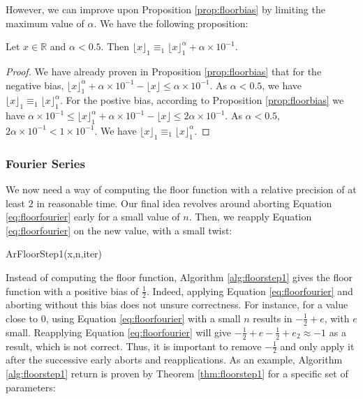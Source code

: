 \documentclass[runningheads]{llncs}
\begin{document}
However, we can improve upon Proposition \ref{prop:floorbias} by limiting the maximum value of $\alpha$. We have the following proposition:\begin{proposition}\label{prop:floorbiasopt}
  Let $x\in\mathbb{R}$ and $\alpha<0.5$. Then $\lfloor x\rfloor_1 \equiv_1 \lfloor x \rfloor_1^\alpha + \alpha\times10^{-1}$.
\end{proposition}
\begin{proof}
  We have already proven in Proposition \ref{prop:floorbias} that for the negative bias, $\lfloor x \rfloor_1^\alpha + \alpha\times 10^{-1} - \lfloor x \rfloor \leq \alpha\times 10^{-1}$. As $\alpha<0.5$, we have $\lfloor x \rfloor_1 \equiv_1 \lfloor x \rfloor_1^\alpha$. For the postive bias, according to Proposition \ref{prop:floorbias} we have $\alpha\times10^{-1} \leq \lfloor x \rfloor_1^\alpha + \alpha\times 10^{-1} - \lfloor x \rfloor \leq 2\alpha\times 10^{-1}$. As $\alpha<0.5$, $2\alpha\times 10^{-1}<1\times 10^{-1}$. We have $\lfloor x \rfloor_1 \equiv_1 \lfloor x \rfloor_1^\alpha$.
\end{proof}

\subsubsection{Fourier Series}
We now need a way of computing the floor function with a relative precision of at least $2$ in reasonable time. Our final idea revolves around aborting Equation \ref{eq:floorfourier} early for a small value of $n$. Then, we reapply Equation \ref{eq:floorfourier} on the new value, with a small twist:

\begin{algorithm}[H]
  \caption{ArFloorStep1(x,n,iter)}
  \label{alg:floorstep1}
\end{algorithm}
Instead of computing the floor function, Algorithm \ref{alg:floorstep1} gives the floor function with a positive bias of $\frac{1}{2}$. Indeed, applying Equation \ref{eq:floorfourier} and aborting without this bias does not unsure correctness. For instance, for a value close to $0$, using Equation \ref{eq:floorfourier} with a small $n$ results in $-\frac{1}{2} + e$, with $e$ small. Reapplying Equation \ref{eq:floorfourier} will give $-\frac{1}{2}+e-\frac{1}{2}+e_2 \approx -1$ as a result, which is not correct. Thus, it is important to remove $-\frac{1}{2}$ and only apply it after the successive early aborts and reapplications. As an example, Algorithm \ref{alg:floorstep1} return is proven by Theorem \ref{thm:floorstep1} for a specific set of parameters:
\end{document}
